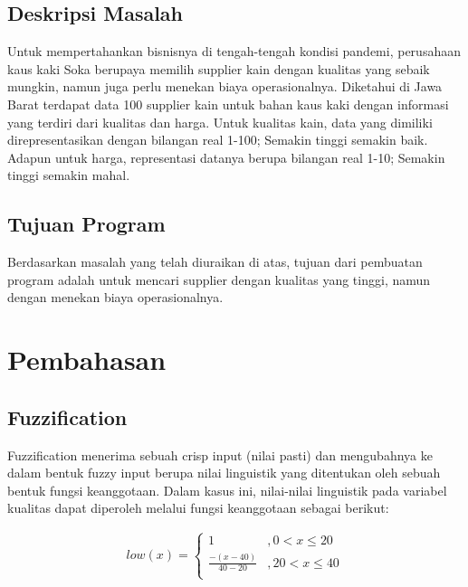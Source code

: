 \documentclass[titlepage]{article}
\begin{document}
        \subsection{Deskripsi Masalah}
            Untuk mempertahankan bisnisnya di tengah-tengah kondisi pandemi, perusahaan kaus kaki Soka berupaya memilih supplier kain dengan kualitas yang sebaik mungkin, namun juga perlu menekan biaya operasionalnya. Diketahui di Jawa Barat terdapat data 100 supplier kain untuk bahan kaus kaki dengan informasi yang terdiri dari kualitas dan harga. Untuk kualitas kain, data yang dimiliki direpresentasikan dengan bilangan real 1-100; Semakin tinggi semakin baik. Adapun untuk harga, representasi datanya berupa bilangan real 1-10; Semakin tinggi semakin mahal.

        \subsection{Tujuan Program}
            Berdasarkan masalah yang telah diuraikan di atas, tujuan dari pembuatan program adalah untuk mencari supplier dengan kualitas yang tinggi, namun dengan menekan biaya operasionalnya.

    \section{Pembahasan}
    
        \subsection{Fuzzification}
            Fuzzification menerima sebuah crisp input (nilai pasti) dan mengubahnya ke dalam bentuk fuzzy input berupa nilai linguistik yang ditentukan oleh sebuah bentuk fungsi keanggotaan. Dalam kasus ini, nilai-nilai linguistik pada variabel kualitas dapat diperoleh melalui fungsi keanggotaan sebagai berikut:

            \begin{equation}
                \begin{split}
                    low(x) = \begin{cases}
                        1 &, 0 < x \le 20 \\
                        \frac{-(x - 40)}{40-20} &, 20 < x \le 40 \\
                    \end{cases}
                \end{split}
            \end{equation}
\end{document}
